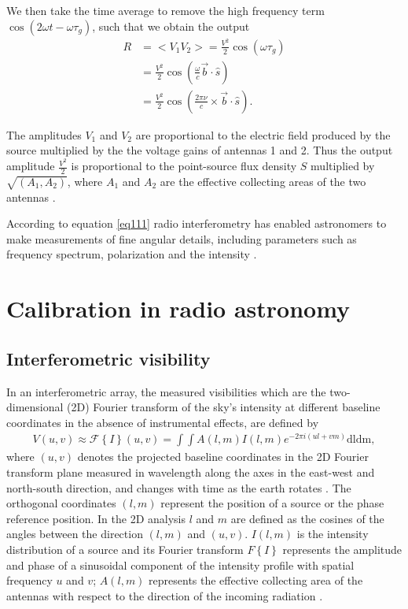 We then take the time average to remove the high frequency term $\cos(2\omega t - \omega \tau_{g})$, such that we obtain the output 
\begin{align}
R&= <V_1V_2> = \frac{V^2}{2}  \cos (\omega\tau_{g})\\
  &= \frac{V^2}{2}  \cos \left( \frac{\omega}{c} \overrightarrow{b} \cdot \widehat{s} \right)\\
   &= \frac{V^2}{2}  \cos \left( \frac{2\pi \nu}{c} \times
   \overrightarrow{b} \cdot \widehat{s} \right). 
\end{align}

The amplitudes $V_1$ and $V_2$ are proportional to the electric field produced by the  source multiplied by the the voltage gains of antennas 1 and 2. Thus the output amplitude $\frac{V^2}{2}$ is proportional to the point-source flux density $S$ multiplied by $\sqrt{(A_1, A_2)}$, where $A_1$ and $A_2$ are the effective collecting areas of the two antennas \citep{NRAO}.

According to equation \ref{eq111} 
radio interferometry has enabled astronomers to make measurements of fine angular  details, including parameters such as frequency spectrum, polarization and the intensity \citep{thompson2001interferometry}.

\section{Calibration in radio astronomy}
\label{Calibr}
\subsection{Interferometric visibility}
In an interferometric array, the measured visibilities  which are the two-dimensional (2D) Fourier transform of the sky's intensity at different baseline coordinates in the absence of instrumental effects, are defined by
\begin{align}
V(u,v)\approx \mathcal{F}\left\{I\right\}(u,v)=\int \int A(l,m) I (l,m)e^{-2\pi i(ul+vm)} \mathrm{dl dm},
\label{Vis}
\end{align}
where $(u,v)$ denotes the projected baseline coordinates in the 2D Fourier transform plane  measured in wavelength along the axes in the east-west and north-south direction, and changes with time as the earth rotates  \citep{taylor1999synthesis}. The orthogonal coordinates $(l, m)$ represent the position of a source or the phase reference position. In the 2D analysis $l$ and $m$ are defined as the cosines of the  angles between the direction $(l,m)$ and $(u, v)$. $I(l,m)$ is the intensity distribution of a source and its Fourier transform  ${F}\left\{I\right\}$ represents the amplitude and phase of a sinusoidal component of the intensity profile with spatial frequency $u$ and $v$; $A(l, m)$ represents the effective collecting area of the antennas with respect to the direction of the incoming radiation \citep{thompson2001interferometry}.

